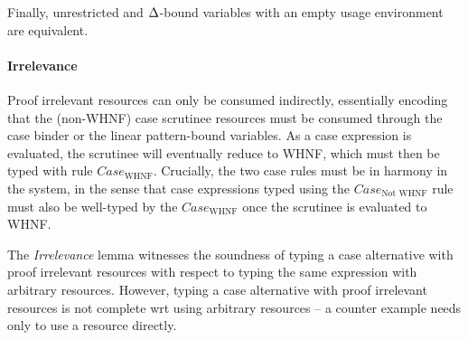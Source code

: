 \documentclass[acmsmall,review,anonymous,screen]{acmart}
\begin{document}
\DeltaLinearRelationLemma


\noindent Finally, unrestricted and $\Delta$-bound
variables with an empty usage environment are equivalent.

\DeltaUnrestrictedRelationLemma

\paragraph{Irrelevance}
%
Proof irrelevant resources can only be consumed
indirectly, essentially encoding that the (non-WHNF) case scrutinee
resources must be consumed through the case binder or the linear
pattern-bound variables.
%
As a case expression is evaluated, the scrutinee will eventually
reduce to WHNF,
which must then be typed with rule $Case_{\textrm{WHNF}}$.
%
Crucially, the two case rules must be in harmony in the system, in the sense that
case expressions typed using the $Case_{\textrm{Not WHNF}}$ rule must also be
well-typed by the $Case_{\textrm{WHNF}}$ once the scrutinee is evaluated to WHNF.



\WHNFConvSoundness

The \emph{Irrelevance} lemma witnesses the soundness of typing a
case alternative with proof irrelevant resources with respect to
typing the same expression with arbitrary resources. However, typing
a case alternative with proof irrelevant resources is not complete wrt using
arbitrary resources -- a counter example needs only to use a resource
directly.
\end{document}
